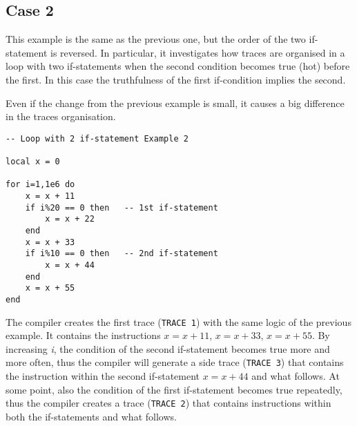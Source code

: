 \newpage

\subsection{Case 2}
\label{2-if-example2}
This example is the same as the previous one, but the order of the two if-statement is reversed. In particular, it investigates how traces are organised in a loop with two if-statements when the second condition  becomes true (hot) before the first. In  this case the truthfulness of the first if-condition implies the second. 

Even if the change from the previous example is small, it causes a big difference in the traces organisation.

\begin{mdframed}[style=LuaStyleFrame]
\begin{lstlisting}[style=LuaStyle]
-- Loop with 2 if-statement Example 2

local x = 0

for i=1,1e6 do
	x = x + 11
	if i%20 == 0 then   -- 1st if-statement
		x = x + 22
	end
	x = x + 33
	if i%10 == 0 then   -- 2nd if-statement
		x = x + 44
	end
	x = x + 55
end
\end{lstlisting}
\end{mdframed}

\noindent
The compiler creates the first trace (\texttt{TRACE 1}) with the same logic of the previous example. It contains the instructions $x=x+11$, $x=x+33$, $x=x+55$. By increasing \textit{i}, the condition of the second if-statement becomes true more and more often, thus the compiler will generate a side trace (\texttt{TRACE 3}) that contains the instruction within the second if-statement $x=x+44$ and what follows. At some point, also the condition of the first if-statement becomes true repeatedly, thus the compiler creates a trace (\texttt{TRACE 2}) that contains instructions within both the if-statements and what follows.

